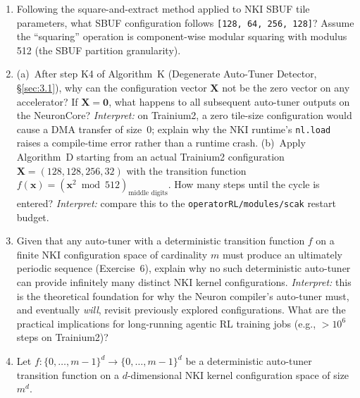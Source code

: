 \documentclass[12pt]{article}
\newcommand{\SBUF}{\textsc{SBUF}}                 %
\begin{document}
\begin{enumerate}
\item[\textbf{3.}] [10] Following the square-and-extract method applied to NKI \SBUF{} tile parameters, what \SBUF{} configuration follows \texttt{[128, 64, 256, 128]}? Assume the ``squaring'' operation is component-wise modular squaring with modulus 512 (the \SBUF{} partition granularity).

\item[\textbf{4.}] [20] (a)~After step K4 of Algorithm~K (Degenerate Auto-Tuner Detector, \S\ref{sec:3.1}), why can the configuration vector $\mathbf{X}$ not be the zero vector on any accelerator? If $\mathbf{X} = \mathbf{0}$, what happens to all subsequent auto-tuner outputs on the NeuronCore? \emph{Interpret:} on Trainium2, a zero tile-size configuration would cause a DMA transfer of size~0; explain why the NKI runtime's \texttt{nl.load} raises a compile-time error rather than a runtime crash. (b)~Apply Algorithm~D starting from an actual Trainium2 configuration $\mathbf{X} = (128, 128, 256, 32)$ with the transition function $f(\mathbf{x}) = (\mathbf{x}^2 \bmod 512)_{\text{middle digits}}$. How many steps until the cycle is entered? \emph{Interpret:} compare this to the \texttt{operatorRL/modules/scak} restart budget.

\item[\textbf{5.}] [15] Given that any auto-tuner with a deterministic transition function $f$ on a finite NKI configuration space of cardinality $m$ must produce an ultimately periodic sequence (Exercise~6), explain why no such deterministic auto-tuner can provide infinitely many distinct NKI kernel configurations. \emph{Interpret:} this is the theoretical foundation for why the Neuron compiler's auto-tuner must, and eventually \emph{will}, revisit previously explored configurations. What are the practical implications for long-running agentic RL training jobs (e.g., $> 10^6$ steps on Trainium2)?

\item[\textbf{6.}] [$M21$] Let $f\colon \{0, \ldots, m-1\}^d \to \{0, \ldots, m-1\}^d$ be a deterministic auto-tuner transition function on a $d$-dimensional NKI kernel configuration space of size $m^d$.


\end{enumerate}
\end{document}
